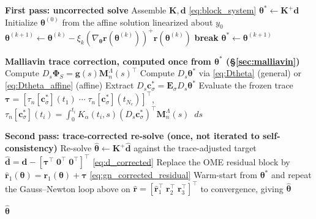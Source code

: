 \documentclass[11pt, a4paper]{article}
\theoremstyle{theoremstyle}
\theoremstyle{definitionstyle}
\newcommand{\dd}{\mathop{}\!d}
\DeclarePairedDelimiter{\norm}{\lVert}{\rVert}
\begin{document}
\begin{algorithm}[htbp]
\begin{algorithmic}[1]
\Statex \textbf{First pass: uncorrected solve}
    \State Assemble $\mathbf K, \mathbf d$ \eqref{eq:block_system} 
    \State $\boldsymbol \theta^* \gets \mathbf K^+ \mathbf d$ 
\Else
    \State Initialize $\boldsymbol \theta^{(0)}$ from the affine solution linearized about $y_0$
        \State $\boldsymbol \theta^{(k+1)} \gets \boldsymbol \theta^{(k)} - \xi_k \left ( \nabla_{\boldsymbol \theta} \mathbf r(\boldsymbol \theta^{(k)}) \right )^+ \mathbf r(\boldsymbol \theta^{(k)})$ 
            \State \textbf{break}
        \EndIf
    \EndFor
    \State $\boldsymbol \theta^* \gets \boldsymbol \theta^{(k+1)}$ 
\EndIf

\Statex \textbf{Malliavin trace correction, computed once from $\boldsymbol \theta^*$ (\S\ref{sec:malliavin})}
\State Compute $D_s \boldsymbol \Phi_S = \mathbf g(s) \mathbf M_n^\Lambda(s)^\top$ 
\State Compute $D_s \boldsymbol \theta^*$ via \eqref{eq:Dtheta} (general) or \eqref{eq:Dtheta_affine} (affine) 
\State Extract $D_s \mathbf c_\sigma^* = \mathbf E_\sigma D_s \boldsymbol \theta^*$ 
\State Evaluate the frozen trace $\boldsymbol \tau = [\tau_n[\mathbf c_\sigma^*](t_1) \; \cdots \; \tau_n[\mathbf c_\sigma^*](t_{N_c})]^\top$, $\tau_n[\mathbf c_\sigma^*](t_i) = \int_0^{t_i} K_\alpha(t_i, s) (D_s \mathbf c_\sigma^*)^\top \mathbf M_n^\Lambda(s) \dd{s}$ 

\Statex \textbf{Second pass: trace-corrected re-solve (once, not iterated to self-consistency)}
    \State Re-solve $\hat{\boldsymbol \theta} \gets \mathbf K^+ \hat{\mathbf d}$ against the trace-adjusted target $\hat{\mathbf d} = \mathbf d - [\boldsymbol \tau^\top \; \mathbf 0^\top \; \mathbf 0^\top]^\top$ \eqref{eq:d_corrected} 
\Else
    \State Replace the OME residual block by $\hat{\mathbf r}_1(\boldsymbol \theta) = \mathbf r_1(\boldsymbol \theta) + \boldsymbol \tau$ \eqref{eq:gn_corrected_residual}
    \State Warm-start from $\boldsymbol \theta^*$ and repeat the Gauss--Newton loop above on $\hat{\mathbf r} = [\hat{\mathbf r}_1^\top \; \mathbf r_2^\top \; \mathbf r_3^\top]^\top$ to convergence, giving $\hat{\boldsymbol \theta}$ 
\EndIf

\State \Return $\hat{\boldsymbol \theta}$
\end{algorithmic}
\end{algorithm}
\end{document}
